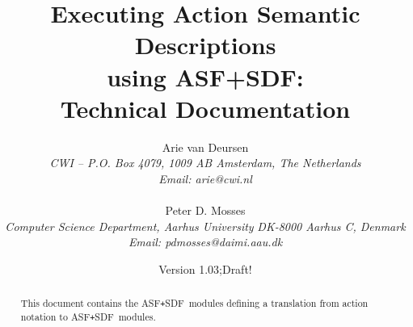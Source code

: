 
\raggedbottom
\setlength{\textwidth}{16cm}
\setlength{\textheight}{22cm}
\setlength{\oddsidemargin}{0.46cm}
\setlength{\evensidemargin}{0.46cm}

\newcommand{\asdf}{\mbox{ASF{\tt +}SDF}}


\newcommand{\asdfmod}[2]{
  \subsubsection{#2}
  \verbatimfile{#1/#2.syn}
  \verbatimfile{#1/#2.eqs}
}


\newcommand{\asdfmodsyn}[2]{
  \subsubsection{#2}
  \verbatimfile{#1/#2.syn}
}


\title{Executing Action Semantic Descriptions\\
	using ASF+SDF:\\
       Technical Documentation}
\author{
  Arie van Deursen\\
  {\footnotesize \sl
     CWI -- P.O. Box 4079, 1009 AB Amsterdam, The Netherlands
  }\\
  {\footnotesize \sl {\rm Email:} arie@cwi.nl} \\
  \\
  Peter D. Mosses\\
  {\footnotesize \sl
    Computer Science Department, Aarhus University
  }
  {\footnotesize \sl
    DK-8000 Aarhus C, Denmark}\\
  {\footnotesize \sl
    {\rm Email:} pdmosses@daimi.aau.dk}\\
}
\date{Version 1.03;Draft!}






  

\maketitle

\begin{abstract}

  This document contains the \asdf\ modules defining
  a translation from action notation to \asdf\ modules.

\end{abstract}



